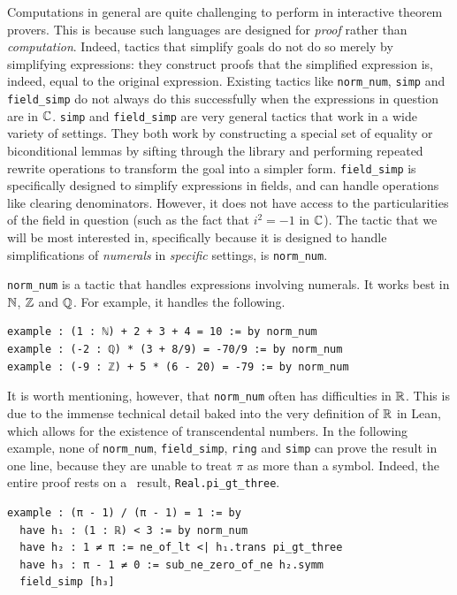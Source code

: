 Computations in general are quite challenging to perform in interactive theorem provers. This is because such languages are designed for \textit{proof} rather than \textit{computation}. Indeed, tactics that simplify goals do not do so merely by simplifying expressions: they construct proofs that the simplified expression is, indeed, equal to the original expression. Existing tactics like \lstinline|norm_num|, \lstinline|simp| and \lstinline|field_simp| do not always do this successfully when the expressions in question are in $\mathbb{C}$. \lstinline|simp| and \lstinline|field_simp| are very general tactics that work in a wide variety of settings. They both work by constructing a special set of equality or biconditional lemmas by sifting through the library and performing repeated rewrite operations to transform the goal into a simpler form. \lstinline|field_simp| is specifically designed to simplify expressions in fields, and can handle operations like clearing denominators. However, it does not have access to the particularities of the field in question (such as the fact that $i^2 = -1$ in $\mathbb{C}$). The tactic that we will be most interested in, specifically because it is designed to handle simplifications of \textit{numerals} in \textit{specific} settings, is \lstinline|norm_num|.

\lstinline|norm_num| is a tactic that handles expressions involving numerals. It works best in $\mathbb{N}$, $\mathbb{Z}$ and $\mathbb{Q}$. For example, it handles the following.
\begin{lstlisting}[caption={\lstinline|norm_num| simplifying expressions in $\N$, $\Z$ and $\Q$}]
example : (1 : ℕ) + 2 + 3 + 4 = 10 := by norm_num
example : (-2 : ℚ) * (3 + 8/9) = -70/9 := by norm_num
example : (-9 : ℤ) + 5 * (6 - 20) = -79 := by norm_num
\end{lstlisting}
It is worth mentioning, however, that \lstinline|norm_num| often has difficulties in $\mathbb{R}$. This is due to the immense technical detail baked into the very definition of $\mathbb{R}$ in Lean, which allows for the existence of transcendental numbers. In the following example, none of \lstinline|norm_num|, \lstinline|field_simp|, \lstinline|ring| and \lstinline|simp| can prove the result in one line, because they are unable to treat $\pi$ as more than a symbol. Indeed, the entire proof rests on a \mathlib\ result, \lstinline|Real.pi_gt_three|.

\begin{lstlisting}[caption=An expression in $\R$ not handled immediately by simplification tactics, label=Ch5:Listing:pi_sub_one_norm_num_fail]
example : (π - 1) / (π - 1) = 1 := by
  have h₁ : (1 : ℝ) < 3 := by norm_num
  have h₂ : 1 ≠ π := ne_of_lt <| h₁.trans pi_gt_three
  have h₃ : π - 1 ≠ 0 := sub_ne_zero_of_ne h₂.symm
  field_simp [h₃]
\end{lstlisting}

